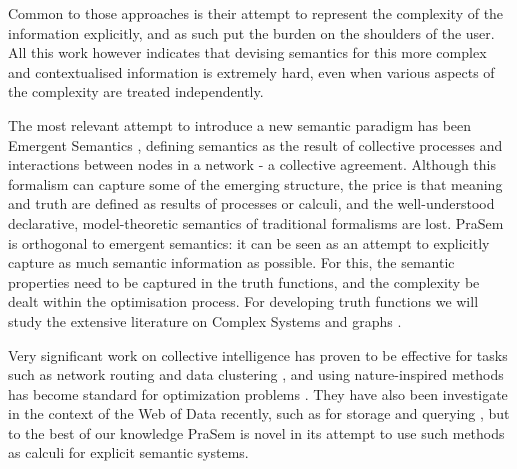 \documentclass[letterpaper]{article}
\begin{document}
Common to those approaches is their attempt to represent the complexity of the information explicitly, and as such put the burden on the shoulders of the user. All this work however indicates that devising semantics for this more complex and contextualised information is extremely hard, even when various aspects of the complexity are treated independently.

The most relevant attempt to introduce a new semantic paradigm has been Emergent Semantics \cite{27}, defining semantics as the result of collective processes and interactions between nodes in a network - a collective agreement. Although this formalism can capture some of the emerging structure, the price is that meaning and truth are defined as results of processes or calculi, and the well-understood declarative, model-theoretic semantics of traditional formalisms are lost. PraSem is orthogonal to emergent semantics: it can be seen as an attempt to explicitly capture as much semantic information as possible. For this, the semantic properties need to be captured in the truth functions, and the complexity be dealt within the optimisation process. For developing truth functions we will study the extensive literature on Complex Systems and graphs \cite{31,32}.

Very significant work on collective intelligence has proven to be effective for tasks such as network routing \cite{38} and data clustering \cite{39}, and using nature-inspired methods has become standard for optimization problems \cite{40,41}. They have also been investigate in the context of the Web of Data recently, such as for storage and querying \cite{42,orenISWC2008}, but to the best of our knowledge PraSem is novel in its attempt to use such methods as calculi for explicit semantic systems.



\end{document}
